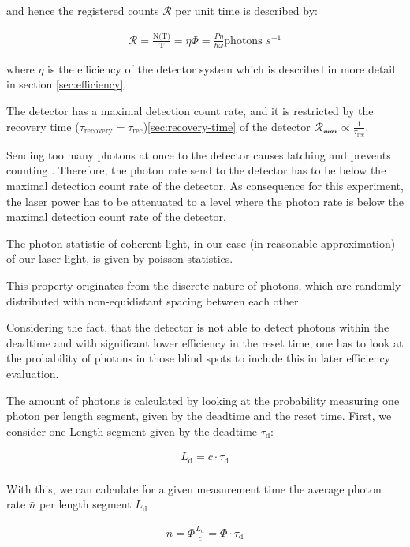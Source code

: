and hence the registered counts $\mathcal{R}$ per unit time is described by:

\begin{align}
    \mathcal{R} = \frac{\text{N(T)}}{\text{T}} = \eta \Phi= \frac{P \eta}{\hbar \omega} \text{photons  $s^{-1}$}
\end{align}

where \textit{$\eta$} is the efficiency of the detector system which is described in more detail in section \ref{sec:efficiency}.

The detector has a maximal detection count rate, and it is restricted by the recovery time ($\tau_{\text{recovery}} = \tau_{\text{rec}}$)\ref{sec:recovery-time} of the detector
$\mathcal{R_{\max}} \propto \frac{1}{\tau_{\text{rec}}}$.

Sending too many photons at once to the detector causes latching and prevents counting \cite{single-quantum-2022}.
Therefore, the photon rate send to the detector has to be below the maximal detection count rate of the detector.
As consequence for this experiment, the laser power has to be attenuated to a level where the photon rate is below the
maximal detection count rate of the detector.

The photon statistic of coherent light, in our case (in reasonable approximation) of our laser light,
is given by poisson statistics.

This property originates from the discrete nature of photons, which are randomly distributed with non-equidistant
spacing between each other.

Considering the fact, that the detector is not able to detect photons within the deadtime and with significant lower efficiency
in the reset time, one has to look at the probability of photons in those blind spots to include this in later efficiency evaluation.

The amount of photons is calculated by looking at the probability measuring one photon per length segment, given by
the deadtime and the reset time.
First, we consider one Length segment given by the deadtime $\tau_{\text{d}}$:

\begin{align}
    L_{\text{d}} = c \cdot \tau_{\text{d}} \\
\end{align}

With this, we can calculate for a given measurement time the average photon rate $\bar{n}$ per length segment $L_{\text{d}}$

\begin{align}
    \bar{n} = \Phi \frac{L_{\text{d}}}{c} = \Phi \cdot \tau_{\text{d}}\\
\end{align}


